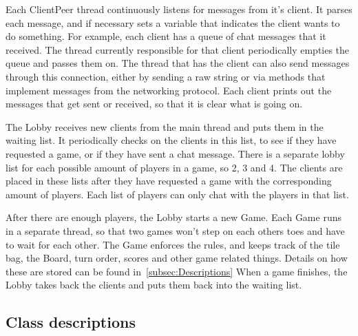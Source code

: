 \documentclass[12pt, letterpaper]{article}
\begin{document}
    Each ClientPeer thread continuously listens for messages from it's client.
    It parses each message, and if necessary sets a variable that indicates the client wants to do something.
    For example, each client has a queue of chat messages that it received.
    The thread currently responsible for that client periodically empties the queue and passes them on.
    The thread that has the client can also send messages through this connection, either by sending a raw string
    or via methods that implement messages from the networking protocol.
    Each client prints out the messages that get sent or received, so that it is clear what is going on.

    The Lobby receives new clients from the main thread and puts them in the waiting list.
    It periodically checks on the clients in this list, to see if they have requested a game, or if they have
    sent a chat message.
    There is a separate lobby list for each possible amount of players in a game, so 2, 3 and 4.
    The clients are placed in these lists after they have requested a game with the corresponding amount of players.
    Each list of players can only chat with the players in that list.

    After there are enough players, the Lobby starts a new Game.
    Each Game runs in a separate thread, so that two games won't step on each others toes
    and have to wait for each other.
    The Game enforces the rules, and keeps track of the tile bag, the Board, turn order, scores and other game
    related things.
    Details on how these are stored can be found in~\autoref{subsec:Descriptions}
    When a game finishes, the Lobby takes back the clients and puts them back into the waiting list.


    \subsection{Class descriptions}
    \label{subsec:Descriptions}

\end{document}
